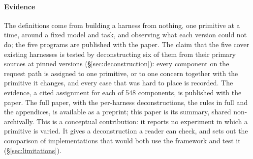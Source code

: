 \paragraph{Evidence} The definitions come from building a harness from nothing, one primitive at a time, around a fixed model and task, and observing what each version could not do; the five programs are published with the paper. The claim that the five cover existing harnesses is tested by deconstructing six of them from their primary sources at pinned versions (\S\ref{sec:deconstruction}): every component on the request path is assigned to one primitive, or to one concern together with the primitive it changes, and every case that was hard to place is recorded. The evidence, a cited assignment for each of 548 components, is published with the paper. The full paper, with the per-harness deconstructions, the rules in full and the appendices, is available as a preprint; this paper is its summary, shared non-archivally. This is a conceptual contribution: it reports no experiment in which a primitive is varied. It gives a deconstruction a reader can check, and sets out the comparison of implementations that would both use the framework and test it (\S\ref{sec:limitations}).
